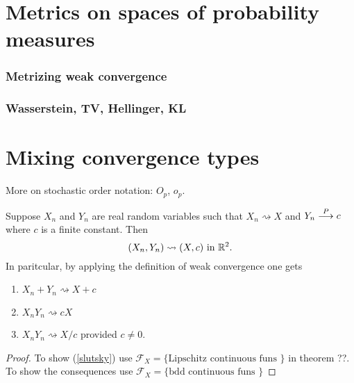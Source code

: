 \clearpage
\begin{shaded}
%
% 
\section{Metrics on spaces of probability measures}

\subsubsection{Metrizing weak convergence}

\subsubsection{Wasserstein, TV, Hellinger, KL}






%
%
\section{Mixing convergence types}


More on stochastic order notation: $O_p$, $o_p$.


\begin{theorem}
Suppose $X_n$ and $Y_n$ are real random variables such that $X_n\rightsquigarrow X$ and $Y_n \overset{\small P} \longrightarrow c$ where $c$ is a finite constant. Then 
\begin{equation}
\label{slutsky}
 (X_n, Y_n)\rightsquigarrow (X, c) \text{ in $\Bbb R^2$.}
 \end{equation} 
In paritcular, by applying the definition of weak convergence one gets
\begin{enumerate}
\item $X_n+Y_n \rightsquigarrow X + c$
\item $X_nY_n \rightsquigarrow cX$
\item $X_nY_n \rightsquigarrow X/c$ provided $c\neq 0$.
\end{enumerate}
\end{theorem}
\begin{proof}
To show (\ref{slutsky}) use $\mathcal F_X=\{\text{Lipschitz continuous funs }\}$ in theorem ??. To show the consequences use $\mathcal F_X=\{\text{bdd continuous funs }\}$
\end{proof}



\end{shaded}
